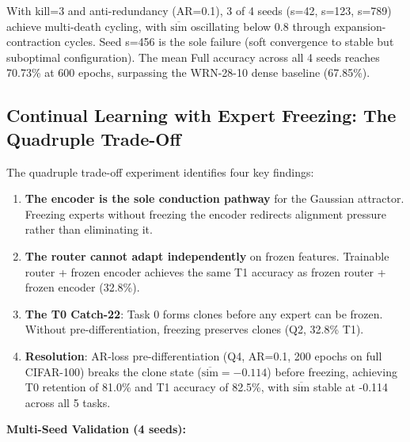 \documentclass[twoside]{article}
\theoremstyle{definition}
\begin{document}
With kill=3 and anti-redundancy (AR=0.1), 3 of 4 seeds (s=42, s=123, s=789) achieve multi-death cycling, with $\overline{\text{sim}}$ oscillating below 0.8 through expansion-contraction cycles. Seed s=456 is the sole failure (soft convergence to stable but suboptimal configuration). The mean Full accuracy across all 4 seeds reaches 70.73\% at 600 epochs, surpassing the WRN-28-10 dense baseline (67.85\%).

\subsection{Continual Learning with Expert Freezing: The Quadruple Trade-Off}

The quadruple trade-off experiment identifies four key findings:

\begin{enumerate}
    \item \textbf{The encoder is the sole conduction pathway} for the Gaussian attractor. Freezing experts without freezing the encoder redirects alignment pressure rather than eliminating it.
    \item \textbf{The router cannot adapt independently} on frozen features. Trainable router + frozen encoder achieves the same T1 accuracy as frozen router + frozen encoder (32.8\%).
    \item \textbf{The T0 Catch-22}: Task 0 forms clones before any expert can be frozen. Without pre-differentiation, freezing preserves clones (Q2, 32.8\% T1).
    \item \textbf{Resolution}: AR-loss pre-differentiation (Q4, AR=0.1, 200 epochs on full CIFAR-100) breaks the clone state ($\overline{\text{sim}}=-0.114$) before freezing, achieving T0 retention of 81.0\% and T1 accuracy of 82.5\%, with $\overline{\text{sim}}$ stable at -0.114 across all 5 tasks.
\end{enumerate}

\textbf{Multi-Seed Validation (4 seeds):}

\begin{table}[ht]
\centering
\caption{Multi-seed validation of Q4 protocol (pre-diff + freeze)}
\end{table}
\end{document}
